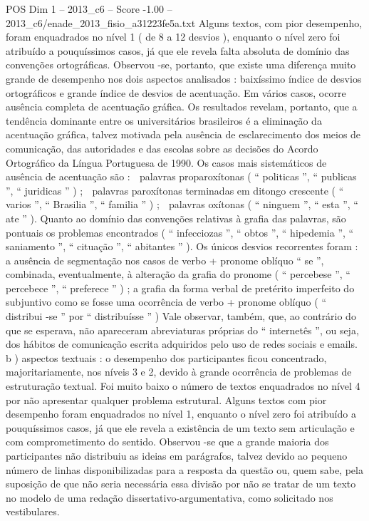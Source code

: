 \begin{textsample}{POS Dim 1 – 2013\_c6 – Score -1.00 – 2013\_c6/enade\_2013\_fisio\_a31223fe5a.txt}
Alguns textos, com pior desempenho, foram enquadrados no nível 1 ( de 8 a 12 desvios ), enquanto o nível zero foi atribuído a pouquíssimos casos, já que ele revela falta absoluta de domínio das convenções ortográficas.
Observou -se, portanto, que existe uma diferença muito grande de desempenho nos dois aspectos analisados : baixíssimo índice de desvios ortográficos e grande índice de desvios de acentuação.
Em vários casos, ocorre ausência completa de acentuação gráfica.
Os resultados revelam, portanto, que a tendência dominante entre os universitários brasileiros é a eliminação da acentuação gráfica, talvez motivada pela ausência de esclarecimento dos meios de comunicação, das autoridades e das escolas sobre as decisões do Acordo Ortográfico da Língua Portuguesa de 1990.
Os casos mais sistemáticos de ausência de acentuação são :  palavras proparoxítonas ( “ politicas ”, “ publicas ”, “ juridicas ” ) ;  palavras paroxítonas terminadas em ditongo crescente ( “ varios ”, “ Brasilia ”, “ familia ” ) ;  palavras oxítonas ( “ ninguem ”, “ esta ”, “ ate ” ).
Quanto ao domínio das convenções relativas à grafia das palavras, são pontuais os problemas encontrados ( “ infecciozas ”, “ obtos ”, “ hipedemia ”, “ saniamento ”, “ cituação ”, “ abitantes ” ).
Os únicos desvios recorrentes foram : a ausência de segmentação nos casos de verbo + pronome oblíquo “ se ”, combinada, eventualmente, à alteração da grafia do pronome ( “ percebese ”, “ percebece ”, “ preferece ” ) ; a grafia da forma verbal de pretérito imperfeito do subjuntivo como se fosse uma ocorrência de verbo + pronome oblíquo ( “ distribui -se ” por “ distribuísse ” ) Vale observar, também, que, ao contrário do que se esperava, não apareceram abreviaturas próprias do “ internetês ”, ou seja, dos hábitos de comunicação escrita adquiridos pelo uso de redes sociais e emails. b ) aspectos textuais : o desempenho dos participantes ficou concentrado, majoritariamente, nos níveis 3 e 2, devido à grande ocorrência de problemas de estruturação textual.
Foi muito baixo o número de textos enquadrados no nível 4 por não apresentar qualquer problema estrutural.
Alguns textos com pior desempenho foram enquadrados no nível 1, enquanto o nível zero foi atribuído a pouquíssimos casos, já que ele revela a existência de um texto sem articulação e com comprometimento do sentido.
Observou -se que a grande maioria dos participantes não distribuiu as ideias em parágrafos, talvez devido ao pequeno número de linhas disponibilizadas para a resposta da questão ou, quem sabe, pela suposição de que não seria necessária essa divisão por não se tratar de um texto no modelo de uma redação dissertativo-argumentativa, como solicitado nos vestibulares.

\end{textsample}
